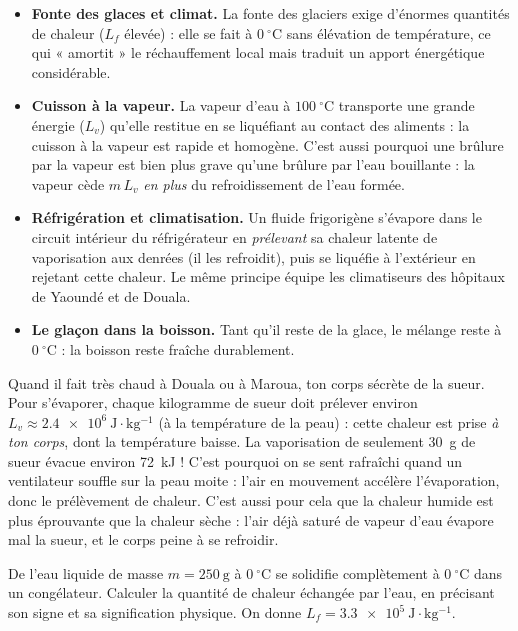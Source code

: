 \documentclass[11pt]{article}
\begin{document}
\begin{itemize}
\item \textbf{Fonte des glaces et climat.} La fonte des glaciers exige d'énormes quantités de chaleur ($L_f$ élevée) : elle se fait à $0\ \mathrm{^\circ C}$ sans élévation de température, ce qui « amortit » le réchauffement local mais traduit un apport énergétique considérable.
\item \textbf{Cuisson à la vapeur.} La vapeur d'eau à $100\ \mathrm{^\circ C}$ transporte une grande énergie ($L_v$) qu'elle restitue en se liquéfiant au contact des aliments : la cuisson à la vapeur est rapide et homogène. C'est aussi pourquoi une brûlure par la vapeur est bien plus grave qu'une brûlure par l'eau bouillante : la vapeur cède $m\,L_v$ \emph{en plus} du refroidissement de l'eau formée.
\item \textbf{Réfrigération et climatisation.} Un fluide frigorigène s'évapore dans le circuit intérieur du réfrigérateur en \emph{prélevant} sa chaleur latente de vaporisation aux denrées (il les refroidit), puis se liquéfie à l'extérieur en rejetant cette chaleur. Le même principe équipe les climatiseurs des hôpitaux de Yaoundé et de Douala.
\item \textbf{Le glaçon dans la boisson.} Tant qu'il reste de la glace, le mélange reste à $0\ \mathrm{^\circ C}$ : la boisson reste fraîche durablement.
\end{itemize}

\begin{savaistu}
Quand il fait très chaud à Douala ou à Maroua, ton corps sécrète de la sueur. Pour s'évaporer, chaque kilogramme de sueur doit prélever environ $L_v \approx \num{2,4e6}\ \mathrm{J \cdot kg^{-1}}$ (à la température de la peau) : cette chaleur est prise \emph{à ton corps}, dont la température baisse. La vaporisation de seulement \SI{30}{g} de sueur évacue environ \SI{72}{kJ} ! C'est pourquoi on se sent rafraîchi quand un ventilateur souffle sur la peau moite : l'air en mouvement accélère l'évaporation, donc le prélèvement de chaleur. C'est aussi pour cela que la chaleur humide est plus éprouvante que la chaleur sèche : l'air déjà saturé de vapeur d'eau évapore mal la sueur, et le corps peine à se refroidir.
\end{savaistu}

\begin{exercice}
De l'eau liquide de masse $m = 250\ \mathrm{g}$ à $0\ \mathrm{^\circ C}$ se solidifie complètement à $0\ \mathrm{^\circ C}$ dans un congélateur. Calculer la quantité de chaleur échangée par l'eau, en précisant son signe et sa signification physique. On donne $L_f = \num{3,3e5}\ \mathrm{J \cdot kg^{-1}}$.
\end{exercice}
\end{document}
